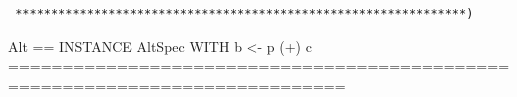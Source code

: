 \documentclass[fleqn,leqno]{article}
\begin{document}
\verb| ***************************************************************)|

\vspace{1em}

\begin{notla}
Alt == INSTANCE AltSpec WITH b <- p (+) c
=============================================================================
\end{notla}
\begin{tlatex}
\@x{}\bottombar\@xx{}%
\end{tlatex}

\bigskip

\end{document}
